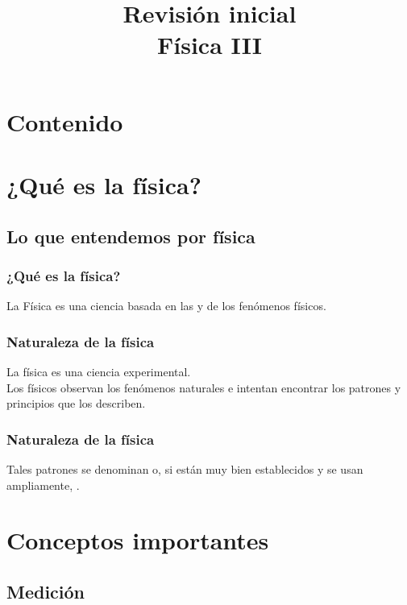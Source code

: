 \documentclass[14pt]{beamer}
\title{\Large{Revisión inicial} \\ \normalsize{Física III}}
\date{}
\begin{document}
\maketitle

\section*{Contenido}

\section{¿Qué es la física?}
\subsection{Lo que entendemos por física}

\begin{frame}
\frametitle{¿Qué es la física?}
La Física es una ciencia basada en las  y  de los fenómenos físicos.
\end{frame}
\begin{frame}
\frametitle{Naturaleza de la física}
La física es una ciencia experimental.
\\
\bigskip
\pause
Los físicos observan los fenómenos naturales e intentan encontrar los patrones y principios que los describen.
\end{frame}
\begin{frame}
\frametitle{Naturaleza de la física}
Tales patrones se denominan  \pause o, si están muy bien establecidos y se usan ampliamente, .
\end{frame}

\section{Conceptos importantes}
\subsection{Medición}
\end{document}
